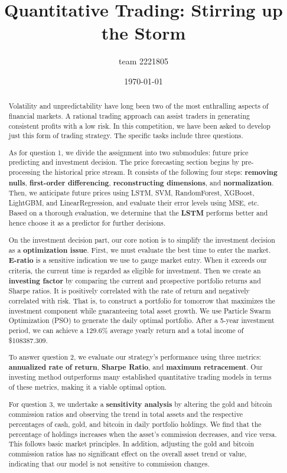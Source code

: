 \documentclass{mcmthesis}
\title{\textbf{Quantitative Trading: Stirring up the Storm}}
\author{team 2221805}
\date{\today}
\begin{document}
\begin{abstract}
	
Volatility and unpredictability have long been two of the most enthralling aspects of financial markets. A rational trading approach can assist traders in generating consistent profits with a low risk. In this competition, we have been asked to develop just this form of trading strategy. The specific tasks include three questions.

As for question 1, we divide the assignment into two submodules: future price predicting and investment decision. The price forecasting section begins by pre-processing the historical price stream. It consists of the following four steps: \textbf{removing nulls}, \textbf{first-order differencing}, \textbf{reconstructing dimensions}, and \textbf{normalization}. Then, we anticipate future prices using  LSTM, SVM, RandomForest, XGBoost, LightGBM, and LinearRegression, and evaluate their error levels using MSE, etc. Based on a thorough evaluation, we determine that the \textbf{LSTM} performs better and hence choose it as a predictor for further decisions. 

On the investment decision part, our core notion is to simplify the investment decision as a \textbf{optimization issue}. First, we must evaluate the best time to enter the market. \textbf{E-ratio} is a sensitive indication we use to gauge market entry. When it exceeds our criteria, the current time is regarded as eligible for investment. Then we create an \textbf{investing factor} by comparing the current and prospective portfolio returns and Sharpe ratios. It is positively correlated with the rate of return and negatively correlated with risk. That is, to construct a portfolio for tomorrow that maximizes the investment component while guaranteeing total asset growth. We use Particle Swarm Optimization (PSO) to generate the daily optimal portfolio. After a 5-year investment period, we can achieve a 129.6\% average yearly return and a total income of \$108387.309.

To answer question 2, we evaluate our strategy's performance using three metrics: \textbf{annualized rate of return}, \textbf{Sharpe Ratio}, and \textbf{maximum retracement}. Our investing method outperforms many established quantitative trading models in terms of these metrics, making it a viable optimal option.

For question 3, we undertake a \textbf{sensitivity analysis} by altering the gold and bitcoin commission ratios and observing the trend in total assets and the respective percentages of cash, gold, and bitcoin in daily portfolio holdings. We find that the percentage of holdings increases when the asset's commission decreases, and vice versa. This follows basic market principles. In addition, adjusting the gold and bitcoin commission ratios has no significant effect on the overall asset trend or value, indicating that our model is not sensitive to commission changes.


\end{abstract}
\end{document}
